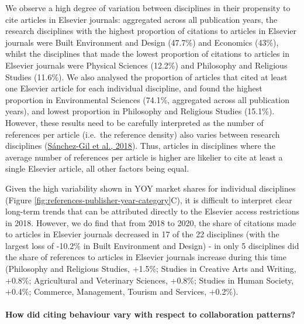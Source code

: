 \documentclass[
]{article}
\begin{document}
We observe a high degree of variation between disciplines in their propensity to cite articles in Elsevier journals: aggregated across all publication years, the research disciplines with the highest proportion of citations to articles in Elsevier journals were Built Environment and Design (47.7\%) and Economics (43\%), whilst the disciplines that made the lowest proportion of citations to articles in Elsevier journals were Physical Sciences (12.2\%) and Philosophy and Religious Studies (11.6\%). We also analysed the proportion of articles that cited at least one Elsevier article for each individual discipline, and found the highest proportion in Environmental Sciences (74.1\%, aggregated across all publication years), and lowest proportion in Philosophy and Religious Studies (15.1\%). However, these results need to be carefully interpreted as the number of references per article (i.e.~the reference density) also varies between research disciplines (\href{https://doi.org/10.1016/j.joi.2017.11.003}{Sánchez-Gil et al., 2018}). Thus, articles in disciplines where the average number of references per article is higher are likelier to cite at least a single Elsevier article, all other factors being equal.

Given the high variability shown in YOY market shares for individual disciplines (Figure \ref{fig:references-publisher-year-category}C), it is difficult to interpret clear long-term trends that can be attributed directly to the Elsevier access restrictions in 2018. However, we do find that from 2018 to 2020, the share of citations made to articles in Elsevier journals decreased in 17 of the 22 disciplines (with the largest loss of -10.2\% in Built Environment and Design) - in only 5 disciplines did the share of references to articles in Elsevier journals increase during this time (Philosophy and Religious Studies, +1.5\%; Studies in Creative Arts and Writing, +0.8\%; Agricultural and Veterinary Sciences, +0.8\%; Studies in Human Society, +0.4\%; Commerce, Management, Tourism and Services, +0.2\%).

\hypertarget{how-did-citing-behaviour-vary-with-respect-to-collaboration-patterns}{%
\paragraph{How did citing behaviour vary with respect to collaboration patterns?}\label{how-did-citing-behaviour-vary-with-respect-to-collaboration-patterns}}
\end{document}

